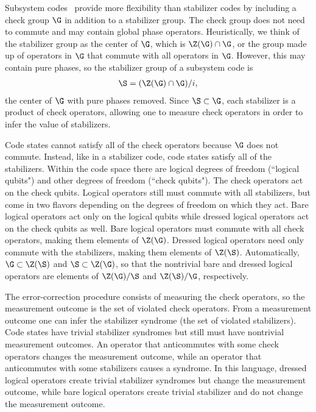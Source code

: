 Subsystem codes~\cite{Poulin2005Subsystem} provide more flexibility than stabilizer codes by including a check group $\G$ in addition to a stabilizer group. The check group does not need to commute and may contain global phase operators. Heuristically, we think of the stabilizer group as the center of $\G$, which is $\Z(\G) \cap \G$, or the group made up of operators in $\G$ that commute with all operators in $\G$. However, this may contain pure phases, so the stabilizer group of a subsystem code is
\begin{align}
\S = (\Z(\G) \cap \G) / i,
\end{align}
the center of $\G$ with pure phases removed. Since $\S \subset \G$, each stabilizer is a product of check operators, allowing one to measure check operators in order to infer the value of stabilizers.

Code states cannot satisfy all of the check operators because $\G$ does not commute. Instead, like in a stabilizer code, code states satisfy all of the stabilizers. Within the code space there are logical degrees of freedom (``logical qubits") and other degrees of freedom (``check qubits").
The check operators act on the check qubits. Logical operators still must commute with all stabilizers, but come in two flavors depending on the degrees of freedom on which they act. Bare logical operators act only on the logical qubits while dressed logical operators act on the check qubits as well. Bare logical operators must commute with all check operators, making them elements of $\Z(\G)$. Dressed logical operators need only commute with the stabilizers, making them elements of $\Z(\S)$. Automatically, $\G \subset \Z(\S)$ and $\S \subset \Z(\G)$, so that the nontrivial bare and dressed logical operators are elements of $\Z(\G)/\S$ and $\Z(\S)/\G$, respectively.

The error-correction procedure consists of measuring the check operators, so the measurement outcome is the set of violated check operators. From a measurement outcome one can infer the stabilizer syndrome (the set of violated stabilizers). Code states have trivial stabilizer syndromes but still must have nontrivial measurement outcomes. An operator that anticommutes with some check operators changes the measurement outcome, while an operator that anticommutes with some stabilizers causes a syndrome. 
In this language, dressed logical operators create trivial stabilizer syndromes but change the measurement outcome, while bare logical operators create trivial stabilizer and do not change the measurement outcome.

